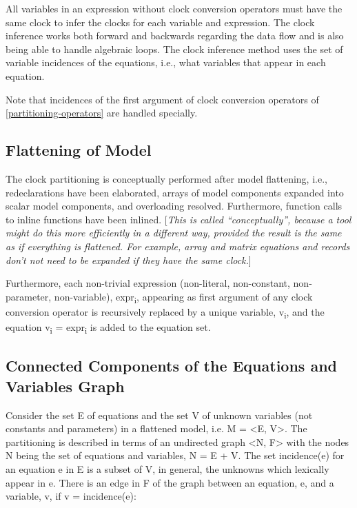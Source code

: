 \documentclass[10pt,a4paper]{report}
\def\doublelabel#1{\label{#1}}
\begin{document}
All variables in an expression without clock conversion operators must
have the same clock to infer the clocks for each variable and
expression. The clock inference works both forward and backwards
regarding the data flow and is also being able to handle algebraic
loops. The clock inference method uses the set of variable incidences of
the equations, i.e., what variables that appear in each equation.

Note that incidences of the first argument of clock conversion operators
of \ref{partitioning-operators} are handled specially.

\subsection{Flattening of Model}\doublelabel{flattening-of-model}

The clock partitioning is conceptually performed after model flattening,
i.e., redeclarations have been elaborated, arrays of model components
expanded into scalar model components, and overloading resolved.
Furthermore, function calls to inline functions have been inlined.
{[}\emph{This is called ``conceptually'', because a tool might do this
more efficiently in a different way, provided the result is the same as
if everything is flattened. For example, array and matrix equations and
records don't not need to be expanded if they have the same clock.}{]}

Furthermore, each non-trivial expression (non-literal, non-constant,
non-parameter, non-variable), expr\textsubscript{i}, appearing as first
argument of any clock conversion operator is recursively replaced by a
unique variable, v\textsubscript{i}, and the equation v\textsubscript{i}
= expr\textsubscript{i} is added to the equation set.

\subsection{Connected Components of the Equations and Variables Graph}\doublelabel{connected-components-of-the-equations-and-variables-graph}

Consider the set E of equations and the set V of unknown variables (not
constants and parameters) in a flattened model, i.e. M = \textless{}E,
V\textgreater{}. The partitioning is described in terms of an undirected
graph \textless{}N, F\textgreater{} with the nodes N being the set of
equations and variables, N = E + V. The set incidence(e) for an equation
e in E is a subset of V, in general, the unknowns which lexically appear
in e. There is an edge in F of the graph between an equation, e, and a
variable, v, if v = incidence(e):
\end{document}

